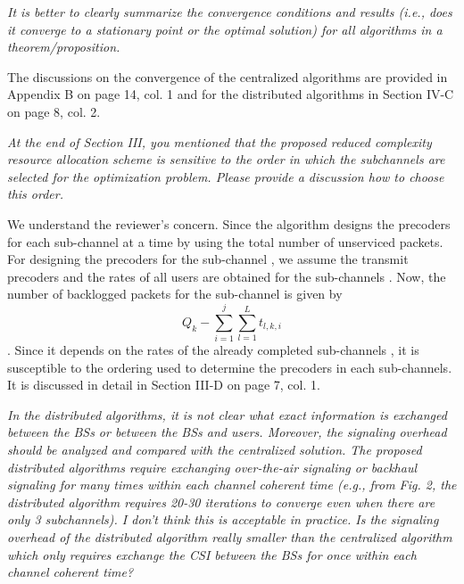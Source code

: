 \begin{itemize}
 \textit{It is better to clearly summarize the convergence conditions and results (i.e., does it converge to a stationary point or the optimal solution) for all algorithms in a theorem/proposition.}

\resp The discussions on the convergence of the centralized algorithms are provided in Appendix B on page 14, col. 1 and for the distributed algorithms in Section IV-C on page 8, col. 2.

 \textit{At the end of Section III, you mentioned that the proposed reduced complexity resource allocation scheme is sensitive to the order in which the subchannels are selected for the optimization problem. Please provide a discussion how to choose this order.}

\resp We understand the reviewer's concern. Since the algorithm designs the precoders for each sub-channel at a time by using the total number of unserviced packets. For designing the precoders for the sub-channel , we assume the transmit precoders and the rates of all users are obtained for the sub-channels . Now, the number of backlogged packets for the  sub-channel is given by 
\[Q_k - \sum_{i=1}^j \sum_{l=1}^L t_{l,k,i}\].
Since it depends on the rates of the already completed sub-channels , it is susceptible to the ordering used to determine the precoders in each sub-channels. It is discussed in detail in Section III-D on page 7, col. 1.

 \textit{In the distributed algorithms, it is not clear what exact information is exchanged between the BSs or between the BSs and users. Moreover, the signaling overhead should be analyzed and compared with the centralized solution. The proposed distributed algorithms require exchanging over-the-air signaling or backhaul signaling for many times within each channel coherent time (e.g., from Fig. 2, the distributed algorithm requires 20-30 iterations to converge even when there are only 3 subchannels). I don’t think this is acceptable in practice. Is the signaling overhead of the distributed algorithm really smaller than the centralized algorithm which only requires exchange the CSI between the BSs for once within each channel coherent time?}


\end{itemize}
